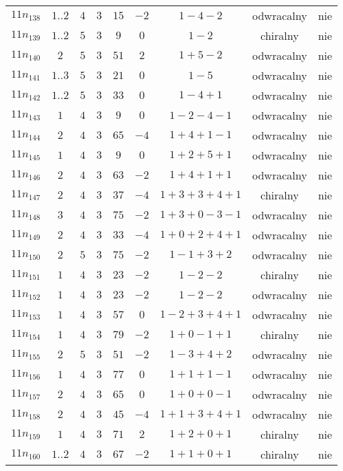 \begin{longtable}{ccccccccc}
$11n_{138}$ & $1..2$ & $4$ & $3$ & $15$ & $-2$ & $1-4-2$ & odwracalny & nie \\
$11n_{139}$ & $1..2$ & $5$ & $3$ & $9$ & $0$ & $1-2$ & chiralny & nie \\
$11n_{140}$ & $2$ & $5$ & $3$ & $51$ & $2$ & $1+5-2$ & odwracalny & nie \\
$11n_{141}$ & $1..3$ & $5$ & $3$ & $21$ & $0$ & $1-5$ & odwracalny & nie \\
$11n_{142}$ & $1..2$ & $5$ & $3$ & $33$ & $0$ & $1-4+1$ & odwracalny & nie \\
$11n_{143}$ & $1$ & $4$ & $3$ & $9$ & $0$ & $1-2-4-1$ & odwracalny & nie \\
$11n_{144}$ & $2$ & $4$ & $3$ & $65$ & $-4$ & $1+4+1-1$ & odwracalny & nie \\
$11n_{145}$ & $1$ & $4$ & $3$ & $9$ & $0$ & $1+2+5+1$ & odwracalny & nie \\
$11n_{146}$ & $2$ & $4$ & $3$ & $63$ & $-2$ & $1+4+1+1$ & odwracalny & nie \\
$11n_{147}$ & $2$ & $4$ & $3$ & $37$ & $-4$ & $1+3+3+4+1$ & chiralny & nie \\
$11n_{148}$ & $3$ & $4$ & $3$ & $75$ & $-2$ & $1+3+0-3-1$ & odwracalny & nie \\
$11n_{149}$ & $2$ & $4$ & $3$ & $33$ & $-4$ & $1+0+2+4+1$ & odwracalny & nie \\
$11n_{150}$ & $2$ & $5$ & $3$ & $75$ & $-2$ & $1-1+3+2$ & odwracalny & nie \\
$11n_{151}$ & $1$ & $4$ & $3$ & $23$ & $-2$ & $1-2-2$ & chiralny & nie \\
$11n_{152}$ & $1$ & $4$ & $3$ & $23$ & $-2$ & $1-2-2$ & odwracalny & nie \\
$11n_{153}$ & $1$ & $4$ & $3$ & $57$ & $0$ & $1-2+3+4+1$ & odwracalny & nie \\
$11n_{154}$ & $1$ & $4$ & $3$ & $79$ & $-2$ & $1+0-1+1$ & chiralny & nie \\
$11n_{155}$ & $2$ & $5$ & $3$ & $51$ & $-2$ & $1-3+4+2$ & odwracalny & nie \\
$11n_{156}$ & $1$ & $4$ & $3$ & $77$ & $0$ & $1+1+1-1$ & odwracalny & nie \\
$11n_{157}$ & $2$ & $4$ & $3$ & $65$ & $0$ & $1+0+0-1$ & odwracalny & nie \\
$11n_{158}$ & $2$ & $4$ & $3$ & $45$ & $-4$ & $1+1+3+4+1$ & odwracalny & nie \\
$11n_{159}$ & $1$ & $4$ & $3$ & $71$ & $2$ & $1+2+0+1$ & chiralny & nie \\
$11n_{160}$ & $1..2$ & $4$ & $3$ & $67$ & $-2$ & $1+1+0+1$ & chiralny & nie \\

\end{longtable}
